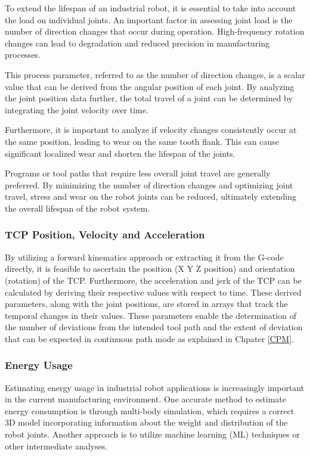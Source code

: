 To extend the lifespan of an industrial robot, it is essential to take into account the load on individual joints. An important factor in assessing joint load is the number of direction changes that occur during operation. High-frequency rotation changes can lead to degradation and reduced precision in manufacturing processes.

This process parameter, referred to as the number of direction changes, is a scalar value that can be derived from the angular position of each joint. By analyzing the joint position data further, the total travel of a joint can be determined by integrating the joint velocity over time.

Furthermore, it is important to analyze if velocity changes consistently occur at the same position, leading to wear on the same tooth flank. This can cause significant localized wear and shorten the lifespan of the joints.

Programs or tool paths that require less overall joint travel are generally preferred. By minimizing the number of direction changes and optimizing joint travel, stress and wear on the robot joints can be reduced, ultimately extending the overall lifespan of the robot system.

\subsubsection*{TCP Position, Velocity and Acceleration}
By utilizing a forward kinematics approach or extracting it from the G-code directly, it is feasible to ascertain the position (X Y Z position) and orientation (rotation) of the TCP. Furthermore, the acceleration and jerk of the TCP can be calculated by deriving their respective values with respect to time. These derived parameters, along with the joint positions, are stored in arrays that track the temporal changes in their values. These parameters enable the determination of the number of deviations from the intended tool path and the extent of deviation that can be expected in continuous path mode as explained in Chpater \ref{CPM}.


\subsubsection*{Energy Usage}
Estimating energy usage in industrial robot applications is increasingly important in the current manufacturing environment. One accurate method to estimate energy consumption is through multi-body simulation, which requires a correct 3D model incorporating information about the weight and distribution of the robot joints. Another approach is to utilize machine learning (ML) techniques or other intermediate analyses.

